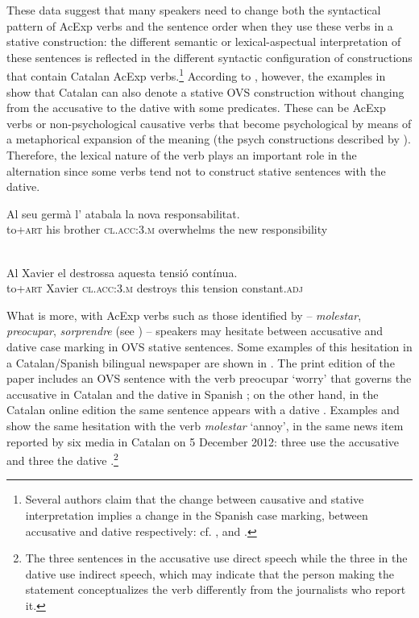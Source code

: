 \documentclass[output=paper,modfonts,nonflat,newtxmath]{langsci/langscibook}
\begin{document}
These data suggest that many speakers need to change both the syntactical pattern of AcExp verbs and the sentence order when they use these verbs in a stative construction: the different semantic or lexical-aspectual interpretation of these sentences is reflected in the different syntactic configuration of constructions that contain Catalan AcExp verbs.\footnote{Several authors claim that the change between causative and stative interpretation implies a change in the Spanish case marking, between accusative and dative respectively: cf. \citet{Fabregas2015}, \citet{Viñas-de-Puig2017} and \citet{Ganeshan2019}.} According to \citep[29-30]{Ginebra2003}, however, the examples in  show that Catalan can also denote a stative OVS construction without changing from the accusative to the dative with some predicates. These can be AcExp verbs  or non-psychological causative verbs that become psychological by means of a metaphorical expansion of the meaning  (the {psych} {constructions} described by \citealt{Bouchard1995}). Therefore, the lexical nature of the verb plays an important role in the alternation since some verbs tend not to construct stative sentences with the dative.

\ea%
	\citealt[29-30]{Ginebra2003}
 \label{ex:royo:4}
 \ea \label{ex:royo:4a}
 \gll Al seu germà l’ atabala la nova responsabilitat.\\
 to+\textsc{art} his brother \textsc{cl.acc:3.m} overwhelms the new responsibility\\
 \\
 \glt
 
 \ex \label{ex:royo:4b}
 \gll Al Xavier el destrossa aquesta tensió contínua.\\
 to+\textsc{art} Xavier \textsc{cl.acc:3.m} destroys this tension constant.\textsc{adj}
 \\
 \glt
 
 \z
 \z

What is more, with AcExp verbs such as those identified by \citet{CabreMateu1998} – \textit{molestar}, \textit{preocupar}, \textit{sorprendre} (see ) – speakers may hesitate between accusative and dative case marking in OVS stative sentences. Some examples of this hesitation in a Catalan/Spanish bilingual newspaper are shown in . The print edition of the paper includes an OVS sentence with the verb {preocupar} ‘worry’ that governs the accusative in Catalan  and the dative in Spanish ; on the other hand, in the Catalan online edition the same sentence appears with a dative . Examples  and  show the same hesitation with the verb \textit{molestar} ‘annoy’, in the same news item reported by six media in Catalan on 5 December 2012: three use the accusative  and three the dative .\footnote{The three sentences in the accusative use direct speech while the three in the dative use indirect speech, which may indicate that the person making the statement conceptualizes the verb differently from the journalists who report it.}
\end{document}
